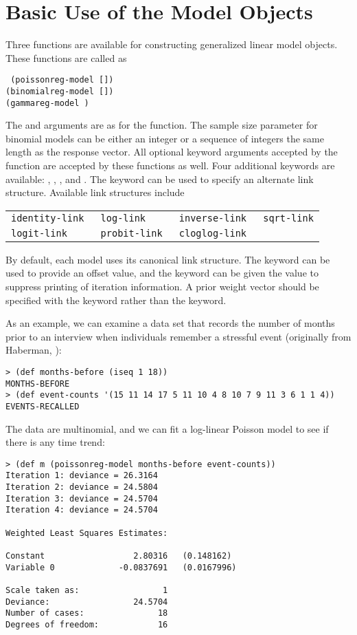 \section{Basic Use of the Model Objects}
Three functions are available for constructing generalized linear
model objects.  These functions are called as
\begin{flushleft}\tt
(poissonreg-model   [])\\
(binomialreg-model    [])\\
(gammareg-model   )
\end{flushleft}
The  and  arguments are as for the
 function. The sample size parameter 
for binomial models can be either an integer or a sequence of integers
the same length as the response vector. All optional keyword
arguments accepted by the  function are
accepted by these functions as well. Four additional keywords are
available:
, , , and .
The keyword  can be used to specify an alternate link
structure. Available link structures include
\begin{center}
\begin{tabular}{llll}
\tt identity-link & \tt log-link    & \tt inverse-link & \tt sqrt-link\\
\tt logit-link    & \tt probit-link & \tt cloglog-link
\end{tabular}
\end{center}
By default, each model uses its canonical link structure.  The
 keyword can be used to provide an offset value, and
the keyword  can be given the value  to
suppress printing of iteration information. A prior weight vector
should be specified with the  keyword rather than the
 keyword.

As an example, we can examine a data set that records the number of
months prior to an interview when individuals remember a stressful
event (originally from Haberman, \cite[p. 2]{JKL}):
\begin{verbatim}
> (def months-before (iseq 1 18))
MONTHS-BEFORE
> (def event-counts '(15 11 14 17 5 11 10 4 8 10 7 9 11 3 6 1 1 4))
EVENTS-RECALLED
\end{verbatim}
The data are multinomial, and we can fit a log-linear Poisson model to
see if there is any time trend:
\begin{verbatim}
> (def m (poissonreg-model months-before event-counts))
Iteration 1: deviance = 26.3164
Iteration 2: deviance = 24.5804
Iteration 3: deviance = 24.5704
Iteration 4: deviance = 24.5704

Weighted Least Squares Estimates:

Constant                  2.80316   (0.148162)
Variable 0             -0.0837691   (0.0167996)

Scale taken as:                 1
Deviance:                 24.5704
Number of cases:               18
Degrees of freedom:            16
\end{verbatim}

